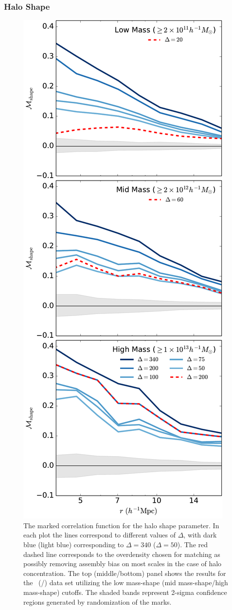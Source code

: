 \documentclass[usenatbib,fleqn]{mnras}
\begin{document}
\subsubsection{Halo Shape}

\begin{figure}
	\centering
	\includegraphics[width=.4\textwidth]{all_mcf_shape.pdf}
	\caption{
The marked correlation function for the halo shape parameter. In each plot the lines correspond to different values of $\Delta$, with dark blue (light blue) corresponding to $\Delta = 340$ ($\Delta = 50$). The red dashed line corresponds to the overdensity chosen for matching as possibly removing assembly bias on most scales in the case of halo concentration. The top (middle/bottom) panel shows the results for the
\simA \ (\simB /\simC) data set utilizing the low mass-shape (mid mass-shape/high mass-shape) cutoffs. The shaded bands represent 2-sigma confidence regions generated by randomization of the marks.}
	\label{fig:cc_mcf_s}
\end{figure}
\end{document}
